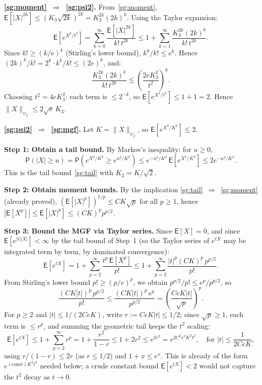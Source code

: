 \documentclass[12pt,a4paper]{article}
\makeatletter
\theoremstyle{definition}
\renewenvironment{proof}[1][\proofname]{\par
  \pushQED{\qed}%
  \normalfont \topsep6\p@\@plus6\p@\relax
  \trivlist
  \item[\hskip\labelsep\bfseries #1\@addpunct{.}]\ignorespaces
}{%
  \popQED\endtrivlist\@endpefalse
}
\newcommand\expc{\mathsf{E}}
\newcommand\prb{\mathsf{P}}
\makeatother
\begin{document}
\begin{proof}
\medskip\noindent\textbf{\ref{sg:moment}~$\Rightarrow$~\ref{sg:psi2}.} From~\ref{sg:moment}, $\expc[|X|^{2k}] \leqslant (K_3\sqrt{2k})^{2k} = K_3^{2k}(2k)^k$. Using the Taylor expansion:
\[
\expc\!\left[e^{X^2/t^2}\right] = \sum_{k=0}^{\infty} \frac{\expc[|X|^{2k}]}{k!\,t^{2k}} \leqslant 1 + \sum_{k=1}^{\infty} \frac{K_3^{2k}(2k)^k}{k!\,t^{2k}}.
\]
Since $k! \geqslant (k/e)^k$ (Stirling's lower bound), $k^k/k! \leqslant e^k$. Hence $(2k)^k/k! = 2^k\cdot k^k/k! \leqslant (2e)^k$, and:
\[
\frac{K_3^{2k}(2k)^k}{k!\,t^{2k}} \leqslant \left(\frac{2eK_3^2}{t^2}\right)^k.
\]
Choosing $t^2 = 4eK_3^2$: each term is $\leqslant 2^{-k}$, so $\expc[e^{X^2/t^2}] \leqslant 1 + 1 = 2$. Hence $\|X\|_{\psi_2} \leqslant 2\sqrt{e}\,K_3$.

\medskip\noindent\textbf{\ref{sg:psi2}~$\Rightarrow$~\ref{sg:mgf}.} Let $K = \|X\|_{\psi_2}$, so $\expc[e^{X^2/K^2}] \leqslant 2$.

\textbf{Step 1: Obtain a tail bound.} By Markov's inequality: for $u \geqslant 0$,
\[
\prb(|X| \geqslant u) = \prb(e^{X^2/K^2} \geqslant e^{u^2/K^2}) \leqslant e^{-u^2/K^2}\,\expc[e^{X^2/K^2}] \leqslant 2e^{-u^2/K^2}.
\]
This is the tail bound~\ref{sg:tail} with $K_2 = K/\sqrt{2}$.

\textbf{Step 2: Obtain moment bounds.} By the implication \ref{sg:tail}~$\Rightarrow$~\ref{sg:moment} (already proved), $(\expc[|X|^p])^{1/p} \leqslant CK\sqrt{p}$ for all $p \geqslant 1$, hence $|\expc[X^p]| \leqslant \expc[|X|^p] \leqslant (CK)^p p^{p/2}$.

\textbf{Step 3: Bound the MGF via Taylor series.} Since $\expc[X] = 0$, and since $\expc[e^{|t||X|}] < \infty$ by the tail bound of Step~1 (so the Taylor series of $e^{tX}$ may be integrated term by term, by dominated convergence):
\[
\expc[e^{tX}] = 1 + \sum_{p=2}^{\infty}\frac{t^p\,\expc[X^p]}{p!} \leqslant 1 + \sum_{p=2}^{\infty}\frac{|t|^p(CK)^p\,p^{p/2}}{p!}.
\]
From Stirling's lower bound $p! \geqslant (p/e)^p$, we obtain $p^{p/2}/p! \leqslant e^p/p^{p/2}$, so
\[
\frac{(CK|t|)^p\,p^{p/2}}{p!} \leqslant \frac{(CK|t|)^p\,e^p}{p^{p/2}} = \left(\frac{CeK|t|}{\sqrt{p}}\right)^p.
\]
For $p \geqslant 2$ and $|t| \leqslant 1/(2CeK)$, write $r := CeK|t| \leqslant 1/2$; since $\sqrt{p} \geqslant 1$, each term is $\leqslant r^p$, and summing the geometric tail keeps the $t^2$ scaling:
\[
\expc[e^{tX}] \leqslant 1 + \sum_{p=2}^\infty r^p = 1 + \frac{r^2}{1-r} \leqslant 1 + 2r^2 \leqslant e^{2r^2} = e^{2C^2e^2K^2t^2}, \quad \text{for } |t| \leqslant \frac{1}{2CeK},
\]
using $r/(1-r) \leqslant 2r$ (as $r \leqslant 1/2$) and $1 + x \leqslant e^x$. This is already of the form $e^{(\text{const})K^2t^2}$ needed below; a crude constant bound $\expc[e^{tX}] < 2$ would not capture the $t^2$ decay as $t \to 0$.


\end{proof}
\end{document}
